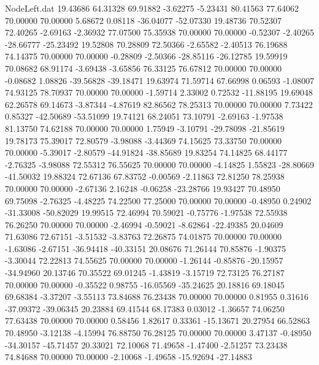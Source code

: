 \begin{filecontents}{NodeLeft.dat}
  19.43686   64.31328   69.91882    -3.62275   -5.23431   80.41563   77.64062   70.00000   70.00000    5.68672    0.08118  -36.04077  -52.07330
  19.48736   70.52307   72.40265    -2.69163   -2.36932   77.07500   75.35938   70.00000   70.00000   -0.52307   -2.40265  -28.66777  -25.23492
  19.52808   70.28809   72.50366    -2.65582   -2.40513   76.19688   74.14375   70.00000   70.00000   -0.28809   -2.50366  -28.85116  -26.12785
  19.59919   70.08682   68.91174    -3.69438   -3.65856   76.33125   76.67812   70.00000   70.00000   -0.08682    1.08826  -39.56828  -39.18471
  19.63974   71.59714   67.66998     0.06593   -1.08007   74.93125   78.70937   70.00000   70.00000   -1.59714    2.33002    0.72532  -11.88195
  19.69048   62.26578   69.14673    -3.87344   -4.87619   82.86562   78.25313   70.00000   70.00000    7.73422    0.85327  -42.50689  -53.51099
  19.74121   68.24051   73.10791    -2.69163   -1.97538   81.13750   74.62188   70.00000   70.00000    1.75949   -3.10791  -29.78098  -21.85619
  19.78173   75.39017   72.80579    -3.98088   -3.44369   74.15625   73.33750   70.00000   70.00000   -5.39017   -2.80579  -44.91824  -38.85689
  19.83254   74.14825   68.44177    -2.76325   -3.98088   72.55312   76.55625   70.00000   70.00000   -4.14825    1.55823  -28.80669  -41.50032
  19.88324   72.67136   67.83752    -0.00569   -2.11863   72.81250   78.25938   70.00000   70.00000   -2.67136    2.16248   -0.06258  -23.28766
  19.93427   70.48950   69.75098    -2.76325   -4.48225   74.22500   77.25000   70.00000   70.00000   -0.48950    0.24902  -31.33008  -50.82029
  19.99515   72.46994   70.59021    -0.75776   -1.97538   72.55938   76.26250   70.00000   70.00000   -2.46994   -0.59021   -8.62864  -22.49385
  20.04609   71.63086   72.67151    -3.51532   -3.83763   72.26875   74.01875   70.00000   70.00000   -1.63086   -2.67151  -36.94418  -40.33151
  20.08676   71.26144   70.85876    -1.90375   -3.30044   72.22813   74.55625   70.00000   70.00000   -1.26144   -0.85876  -20.15957  -34.94960
  20.13746   70.35522   69.01245    -1.43819   -3.15719   72.73125   76.27187   70.00000   70.00000   -0.35522    0.98755  -16.05569  -35.24625
  20.18816   69.18045   69.68384    -3.37207   -3.55113   73.84688   76.23438   70.00000   70.00000    0.81955    0.31616  -37.09372  -39.06345
  20.23884   69.41544   68.17383     0.03012   -1.36657   74.06250   77.63438   70.00000   70.00000    0.58456    1.82617    0.33361  -15.13671
  20.27954   66.52863   70.48950    -3.12138   -4.15994   76.88750   76.28125   70.00000   70.00000    3.47137   -0.48950  -34.30157  -45.71457
  20.33021   72.10068   71.49658    -1.47400   -2.51257   73.23438   74.84688   70.00000   70.00000   -2.10068   -1.49658  -15.92694  -27.14883

\end{filecontents}
